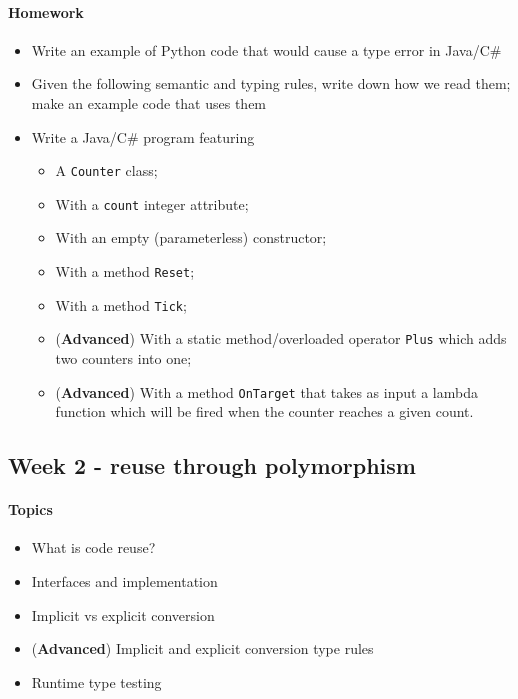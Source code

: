 \documentclass[12pt,a4paper,draft]{article}
\begin{document}
		\paragraph*{Homework}
		\begin{itemize}
			\item Write an example of Python code that would cause a type error in Java/C\#
			\item Given the following semantic and typing rules, write down how we read them; make an example code that uses them
			\item Write a Java/C\# program featuring
			\begin{itemize}
				\item A \texttt{Counter} class;
				\item With a \texttt{count} integer attribute;
				\item With an empty (parameterless) constructor;
				\item With a method \texttt{Reset};
				\item With a method \texttt{Tick};
				\item (\textbf{Advanced}) With a static method/overloaded operator \texttt{Plus} which adds two counters into one;
				\item (\textbf{Advanced}) With a method \texttt{OnTarget} that takes as input a lambda function which will be fired when the counter reaches a given count.
			\end{itemize}
		\end{itemize}
		
		
		
		\subsection{Week 2 - reuse through polymorphism}
		
		\paragraph*{Topics}			
		\begin{itemize}
			\item What is code reuse?
			\item Interfaces and implementation
			\item Implicit vs explicit conversion
			\item (\textbf{Advanced}) Implicit and explicit conversion type rules
			\item Runtime type testing
		\end{itemize}
		
\end{document}

